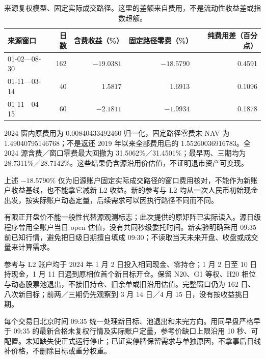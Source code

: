 \begin{table}[H]\centering\small
\begin{tabular}{lrrrr}
\toprule 来源窗口 & 日数 & 含费收益（\%） & 固定路径零费（\%） & 纯费用差（百分点）\\\midrule
01-02—08-30 & 162 & $-19.0381$ & $-18.5790$ & 0.4591\\
01-11—03-14 & 40 & 1.5817 & 1.6913 & 0.1096\\
01-11—04-15 & 60 & $-2.1811$ & $-1.9934$ & 0.1878\\
\bottomrule
\end{tabular}
\caption{来源复权模型、固定实际成交路径。这里的差额来自费用，不是流动性收益差或指数超额。}
\end{table}

2024 窗内原费用为 0.00840433492460 归一化，固定路径零费末 NAV 为 1.49040795146768；不是返还 2019 年以来全部费用后的 1.55260036916783。全 2024 源含费／窗口零费最大回撤为 31.5062\%／31.4501\%；最早两、三期均为 28.7311\%／28.7142\%。这些结果仍含源沿用价估值，不证明退市资产可变现。

上述 $-18.5790\%$ 仅为旧源账户固定实际成交路径的窗口费用核对，不能作为新账户收益基线，也不能拿它减新 L2 收益。新的参考与 L2 均从一次人民币初始现金出发，按实际账户动态定量，后续需求可以因执行路径不同而不同。

有限正开盘价不能一般性代替源观测标志；此次提供的原矩阵已实际读入。源日级程序曾用全账户当日 open 估值，没有共同秒级委托时间。新实验明确采用 09:35 前已知行情，避免把日级日期擅自填成 09:30；不读取当天未来开盘、收盘或成交量来计算需求。

\clearpage
{}

参考与 L2 账户均于 2024 年 1 月 2 日投入相同现金、零持仓；1 月 2 日至 10 日持现金，1 月 11 日遇到原相位首个新目标开仓。保留 N20、G1 等权、H20 相位与动态股票池退出，不接旧持仓、旧余单或旧沿用估值。完整窗口仍为 162 日、八次新目标；前两／三期仍先观察到 3 月 14 日／4 月 15 日，没有按收益挑日期。

每个交易日北京时间 09:35 统一处理新目标、池退出和未完方向。用同早盘严格早于 09:35 的最新合格未复权行情及实际账户定量，参考价缺口上限沿用 10 秒、可配置。未知缺失使正式运行停止；已证实停牌保留需求与单独原因，不拿事后日线补价格，不删除目标或重分权重。

